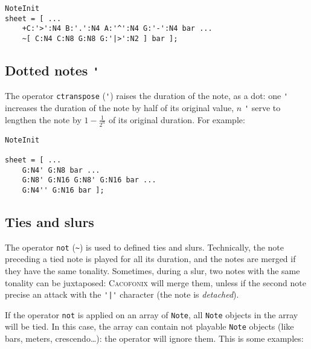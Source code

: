 \documentclass{article}
\newcommand\cacofonix{\textsc{Cacofonix}\xspace}
\newcommand\note{\lstinline!Note!\xspace}
\begin{document}
\begin{lstlisting}
NoteInit
sheet = [ ...
	+C:'>':N4 B:'.':N4 A:'^':N4 G:'-':N4 bar ...
	~[ C:N4 C:N8 G:N8 G:'|>':N2 ] bar ];
\end{lstlisting}

\subsection{Dotted notes \lstinline!'!}
\label{sec:DottedNotes}

The operator \lstinline!ctranspose! (\lstinline!'!) raises the duration of the note, as a dot: one \lstinline!'! increases the duration of the note by half of its original value, $n$ \lstinline!'! serve to lengthen the note by $1 - \frac{1}{2^n}$ of its original duration. For example: \\

\begin{lstlisting}
NoteInit

sheet = [ ...
	G:N4' G:N8 bar ...
	G:N8' G:N16 G:N8' G:N16 bar ...
	G:N4'' G:N16 bar ];
\end{lstlisting}

\subsection{Ties and slurs}
\label{sec:TiesAndSlurs}

The operator \lstinline!not! (\lstinline!~!) is used to defined ties and slurs. Technically, the note preceding a tied note is played for all its duration, and the notes are merged if they have the same tonality. Sometimes, during a slur, two notes with the same tonality can be juxtaposed: \cacofonix will merge them, unless if the second note precise an attack with the \lstinline!'|'! character (the note is \emph{detached}).

If the operator \lstinline!not! is applied on an array of \note, all \note objects in the array will be tied. In this case, the array can contain not playable \note objects (like bars, meters, crescendo\dots): the operator will ignore them. This is some examples: \\
\end{document}
